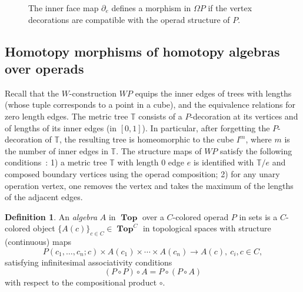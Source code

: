 \documentclass{amsart}
\theoremstyle{definition}
\newtheorem{definition}[formula]{Definition}
\theoremstyle{remark}
\newcommand{\T}{\mathbb T}
\newcommand{\lb}{\lbrace}
\newcommand{\rb}{\rbrace}
\DeclareMathOperator{\Top}{\mathbf{Top}}
\begin{document}
\begin{figure}
\begin{center}
			\caption{The inner face map $\partial_e$ defines a morphism in $\Omega P$ if the vertex decorations are compatible with the operad structure of $P.$}
			\label{fig:inner_face_map}
		\end{center}
	\end{figure}

    
	\subsection{Homotopy morphisms of homotopy algebras over operads}\label{ssec:homoalg}
	
	Recall that the $W$-construction $WP$ equips the inner edges of trees with lengths (whose tuple corresponds to a point in a cube),
	and the equivalence relations for zero length edges.
	The metric tree $\T$ consists of a $P$-decoration at its vertices and of lengths of its inner edges (in $[0,1]$).
	In particular, after forgetting the $P$-decoration of $\T$, the resulting tree is homeomorphic to the cube $I^{m}$, where $m$ is the number of inner edges in $\T$.
	The structure maps of $WP$ satisfy the following conditions~\cite{be-mo-06'}: 1) a metric tree $\T$ with length $0$ edge $e$ is identified with $\T/e$ and composed boundary vertices using the operad composition; 2) for any unary operation vertex, one removes the vertex and takes the maximum of the lengths of the adjacent edges.
	
	\begin{definition}
		An \emph{algebra} $A$ in $\Top$ over a $C$-colored operad $P$ in sets is a $C$-colored object $\lb A(c)\rb_{c\in C}\in \Top^{C}$ in topological spaces with structure (continuous) maps
		\[
		P(c_{1},\dots,c_{n};c)\times A(c_{1})\times\cdots\times A(c_{n})\to A(c),\ 
		c_{i},c\in C,
		\]
		satisfying infinitesimal associativity conditions
		\[
		(P\circ P)\circ A=P\circ (P\circ A)
		\]
		with respect to the compositional product $\circ$.
	\end{definition}
	
\end{document}
